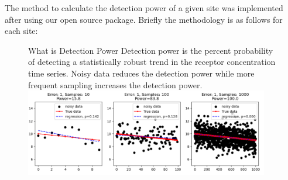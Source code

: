 The method to calculate the detection power of a given site was implemented after \citet{dumont_determining_nodate}
using our open source package\citep{dumont_komanawagw_detect_power_2023}.
Briefly the methodology is as follows for each site:

\begin{figure}
    \begin{breakawaybox}[label={box:dp}]{What is Detection Power}
        Detection power is the percent probability of detecting a statistically robust trend in the receptor concentration time series. Noisy data reduces the detection power while more frequent sampling increases the detection power.
        \\
        \includegraphics[width=0.95\textwidth]{figures/dp_ex}
    \end{breakawaybox}
\end{figure}

